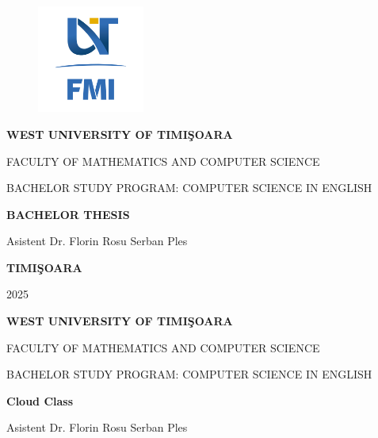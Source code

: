 \documentclass[12pt,a4paper]{book}
\theoremstyle{definition}
\theoremstyle{remark}
\begin{document}
\sloppy

\thispagestyle{empty}
\begin{center}
\begin{figure}[h!]
\vspace{-20pt}
\begin{center}
\includegraphics[width=100pt]{FMI-03.png}
\end{center}
\end{figure}


{\large{\bf WEST UNIVERSITY OF TIMI\c SOARA

FACULTY OF MATHEMATICS AND COMPUTER SCIENCE

BACHELOR STUDY PROGRAM:  COMPUTER SCIENCE IN ENGLISH  
}}

\vspace{120pt}
{\huge {\bf BACHELOR THESIS}}

\vspace{160pt}
\end{center}

{\large{}

\noindent Asistent Dr. Florin Rosu \hfill 
\noindent Serban Ples
}

\vfill
\begin{center}
{\bf TIMI\c SOARA

2025}
\end{center}
\newpage
\thispagestyle{empty}
\begin{center}
{\large{\bf WEST UNIVERSITY OF TIMI\c SOARA
		
FACULTY OF MATHEMATICS AND COMPUTER SCIENCE
		
BACHELOR STUDY PROGRAM:  COMPUTER SCIENCE IN ENGLISH}}

\vspace{200pt}
{\huge {\bf Cloud Class }}

\vspace{153pt}
\end{center}

{\large{}

\noindent Asistent Dr. Florin Rosu \hfill 
\noindent Serban Ples
}
 
\end{document}
